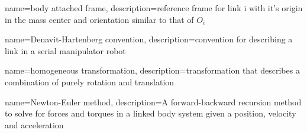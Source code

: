 \makeglossaries
 
 
{
    name={body attached frame},
    description={reference frame for link i with it's origin in the mass center and orientation similar to that of $O_i$}
}

{
    name={Denavit-Hartenberg convention},
    description={convention for describing a link in a serial manipulator robot}
}

{
    name={homogeneous transformation},
    description={transformation that describes a combination of purely rotation and translation}
}


{
    name={Newton-Euler method},
    description={A forward-backward recursion method to solve for forces and torques in a linked body system given a position, velocity and acceleration}
}